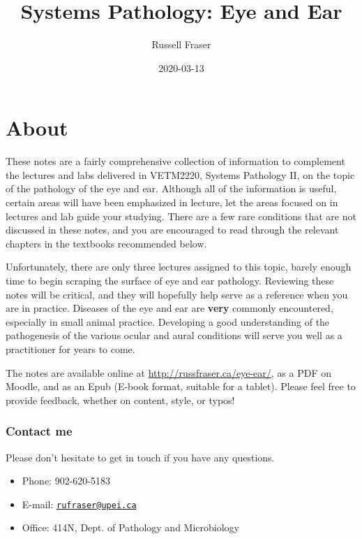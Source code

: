 \documentclass[openany]{article}
\title{Systems Pathology: Eye and Ear}
\author{Russell Fraser}
\date{2020-03-13}
\providecommand{\tightlist}{%
  \setlength{\itemsep}{0pt}\setlength{\parskip}{0pt}}
\begin{document}
\maketitle

{
\setcounter{tocdepth}{2}
\tableofcontents
}
\section*{About}\label{about}

These notes are a fairly comprehensive collection of information to
complement the lectures and labs delivered in VETM2220, Systems
Pathology II, on the topic of the pathology of the eye and ear. Although
all of the information is useful, certain areas will have been
emphasized in lecture, let the areas focused on in lectures and lab
guide your studying. There are a few rare conditions that are not
discussed in these notes, and you are encouraged to read through the
relevant chapters in the textbooks recommended below.

Unfortunately, there are only three lectures assigned to this topic,
barely enough time to begin scraping the surface of eye and ear
pathology. Reviewing these notes will be critical, and they will
hopefully help serve as a reference when you are in practice. Diseases
of the eye and ear are \textbf{very} commonly encountered, especially in
small animal practice. Developing a good understanding of the
pathogenesis of the various ocular and aural conditions will serve you
well as a practitioner for years to come.

The notes are available online at \url{http://russfraser.ca/eye-ear/},
as a PDF on Moodle, and as an Epub (E-book format, suitable for a
tablet). Please feel free to provide feedback, whether on content,
style, or typos!

\subsubsection*{Contact me}\label{contact-me}

Please don't hesitate to get in touch if you have any questions.

\begin{itemize}
\tightlist
\item
  Phone: 902-620-5183
\item
  E-mail: \href{mailto:rufraser@upei.ca}{\nolinkurl{rufraser@upei.ca}}
\item
  Office: 414N, Dept. of Pathology and Microbiology
\end{itemize}
\end{document}
